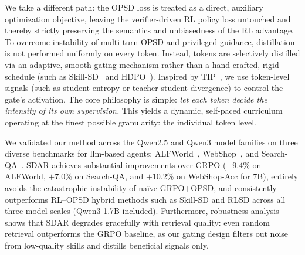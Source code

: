 \documentclass{llmxive}
\providecommand{\methodname}{\textsc{SDAR}\xspace}
\begin{document}
We take a different path: the OPSD loss is treated as a direct, auxiliary optimization objective, leaving the verifier-driven RL policy loss untouched and thereby strictly preserving the semantics and unbiasedness of the RL advantage. To overcome instability of multi-turn OPSD and privileged guidance, distillation is not performed uniformly on every token. Instead, tokens are selectively distilled via an adaptive, smooth gating mechanism rather than a hand-crafted, rigid schedule (such as Skill-SD~\citep{wang2026skillsd} and HDPO~\citep{ding2026hdpo}). Inspired by TIP~\citep{xu2026tip}, we use token-level signals (such as student entropy or teacher-student divergence) to control the gate's activation. The core philosophy is simple: \emph{let each token decide the intensity of its own supervision.}
This yields a dynamic, self-paced curriculum operating at the finest possible granularity: the individual token level.

We validated our method across the Qwen2.5 and Qwen3 model families on three diverse benchmarks for llm-based agents: ALFWorld~\citep{shridhar2020alfworld}, WebShop~\citep{yao2022webshop}, and Search-QA~\citep{jin2025searchr1}. \methodname{} achieves substantial improvements over GRPO ($+9.4\%$ on ALFWorld, $+7.0\%$ on Search-QA, and $+10.2\%$ on WebShop-Acc for 7B), entirely avoids the catastrophic instability of na\"ive GRPO+OPSD, and consistently outperforms RL--OPSD hybrid methods such as Skill-SD and RLSD across all three model scales (Qwen3-1.7B included). Furthermore, robustness analysis shows that \methodname{} degrades gracefully with retrieval quality: even random retrieval outperforms the GRPO baseline, as our gating design filters out noise from low-quality skills and distills beneficial signals only. 
\end{document}
